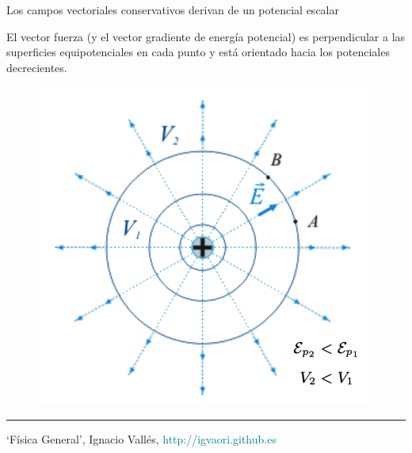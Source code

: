 \begin{small}
\begin{myexampleblock}{Los campos vectoriales conservativos derivan de un potencial escalar}
\begin{multicols}{2}
\vspace{2mm} El vector fuerza (y el vector gradiente de energía potencial) es perpendicular a las superficies equipotenciales en cada punto y está orientado hacia los potenciales decrecientes.

\begin{figure}[H]
		\centering
		\includegraphics[width=.4\textwidth]{imagenes/img02-20.png}
		\end{figure}
\end{multicols}		

\begin{flushright}
\begin{scriptsize}
	\rule{250pt}{0.1pt}

\textcolor{gris}{`Física General', Ignacio Vallés, }\textcolor{teal}{{http://igvaori.github.es}} $\quad$
\end{scriptsize}	
\end{flushright}

 
\end{myexampleblock}
\end{small}	



